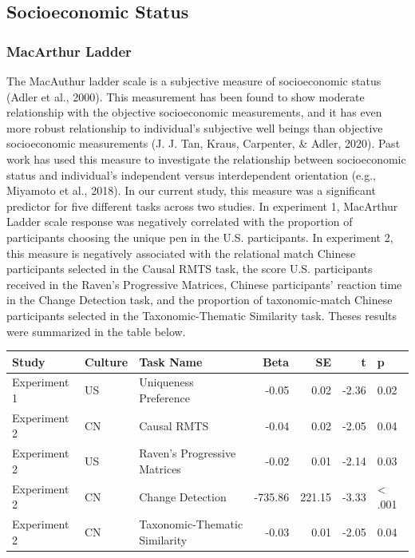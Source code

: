 \documentclass[
  man,floatsintext]{apa6}
\begin{document}
\hypertarget{socioeconomic-status}{%
\subsection{Socioeconomic Status}\label{socioeconomic-status}}

\hypertarget{macarthur-ladder}{%
\subsubsection{MacArthur Ladder}\label{macarthur-ladder}}

The MacAuthur ladder scale is a subjective measure of socioeconomic status (Adler et al., 2000). This measurement has been found to show moderate relationship with the objective socioeconomic measurements, and it has even more robust relationship to individual's subjective well beings than objective socioeconomic measurements (J. J. Tan, Kraus, Carpenter, \& Adler, 2020). Past work has used this measure to investigate the relationship between socioeconomic status and individual's independent versus interdependent orientation (e.g., Miyamoto et al., 2018). In our current study, this measure was a significant predictor for five different tasks across two studies. In experiment 1, MacArthur Ladder scale response was negatively correlated with the proportion of participants choosing the unique pen in the U.S. participants. In experiment 2, this measure is negatively associated with the relational match Chinese participants selected in the Causal RMTS task, the score U.S. participants received in the Raven's Progressive Matrices, Chinese participants' reaction time in the Change Detection task, and the proportion of taxonomic-match Chinese participants selected in the Taxonomic-Thematic Similarity task. Theses results were summarized in the table below.

\begin{table}
\centering\begingroup\fontsize{9.5}{11.5}\selectfont

\begin{tabular}{l|l|l|r|r|r|l}
\hline
Study & Culture & Task Name & Beta & SE & t & p\\
\hline
Experiment 1 & US & Uniqueness Preference & -0.05 & 0.02 & -2.36 & 0.02\\
Experiment 2 & CN & Causal RMTS & -0.04 & 0.02 & -2.05 & 0.04\\
Experiment 2 & US & Raven's Progressive Matrices & -0.02 & 0.01 & -2.14 & 0.03\\
Experiment 2 & CN & Change Detection & -735.86 & 221.15 & -3.33 & < .001\\
Experiment 2 & CN & Taxonomic-Thematic Similarity & -0.03 & 0.01 & -2.05 & 0.04\\
\hline
\end{tabular}
\endgroup{}
\end{table}
\end{document}
